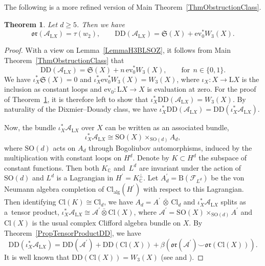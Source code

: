 \documentclass[11pt]{article}
\numberwithin{equation}{section}
\numberwithin{equation}{section}
\newtheorem{Theorem}{Theorem}[section]
\newcommand{\C}{\mathbb{C}}
\newcommand{\B}{\mathrm{B}}
\newcommand{\A}{\mathcal{A}}
\newcommand{\Cl}{\mathrm{Cl}}
\newcommand{\SO}{\mathrm{SO}}
\renewcommand{\L}{\mathrm{L}}
\newcommand{\DD}{\mathrm{DD}}
\newcommand{\oclass}{\mathfrak{or}}
\begin{document}
The following is a more refined version of Main Theorem~\ref{ThmObstructionClass}.

\begin{Theorem} \label{ThmRepeatedMain}
Let $d\geq 5$. Then we have
\begin{equation*}
\oclass(\A_{\L X}) = \tau(w_2), \qquad \DD(\A_{\L X}) = \mathfrak{S}(X) + \mathrm{ev}_0^*W_3(X).
\end{equation*}
\end{Theorem}

\begin{proof}
With a view on Lemma~\ref{LemmaH3BLSOZ}, it follows from Main Theorem~\ref{ThmObstructionClass} that
\begin{equation*}
\DD(\mathcal{A}_{\L X}) = \mathfrak{S}(X) + n \, \mathrm{ev}_0^*W_3(X), \qquad \text{for}~~n \in \{0, 1\}.
\end{equation*}
We have $\iota_X^* \mathfrak{S}(X) = 0$ and $\iota_X^*\mathrm{ev}_0^*W_3(X) = W_3(X)$, where $\iota_X \colon X \to \L X$ is the inclusion as constant loops and $\mathrm{ev}_0 \colon \L X \to X$ is evaluation at zero.
For the proof of Theorem~\ref{ThmRepeatedMain}, it is therefore left to show that $\iota_X^* \DD(\mathcal{A}_{\L X}) = W_3(X)$.
By naturality of the Dixmier--Douady class, we have $\iota_X^* \DD(\mathcal{A}_{\L X}) = \DD(\iota_X^*\mathcal{A}_{\L X})$.

Now, the bundle $\iota_X^*\mathcal{A}_{\L X}$ over $X$ can be written as an associated bundle,
\begin{equation*}
 \iota_X^*\mathcal{A}_{\L X} \cong \SO(X) \times_{\SO(d)} A_d,
\end{equation*}
where $\SO(d)$ acts on $A_d$ through Bogoliubov automorphisms, induced by the multiplication with constant loops on $H^d$.
Denote by $K\subset H^d$ the subspace of constant functions.
Then both $K_\C$ and~$L^d$ are invariant under the action of $\SO(d)$ and $L^d$ is a Lagrangian in $H^\prime = K_\C^\perp$.
Let $A_d^\prime = \B(\mathcal{F}_{L^d})$ be the von Neumann algebra completion of $\Cl_{\mathrm{alg}}(H^\prime)$ with respect to this Lagrangian.
Then identifying $\Cl(K) \cong \Cl_d$, we have $A_d = A^\prime \,\bar{\otimes}\, \Cl_d$ and $\iota_X^*\mathcal{A}_{\L X}$ splits as a~tensor product, $\iota_X^*\mathcal{A}_{\L X} \cong \mathcal{A}^\prime \bar{\otimes}\Cl(X)$, where $\mathcal{A}^\prime = \SO(X) \times_{\SO(d)} A^\prime$ and $\Cl(X)$ is the usual complex Clifford algebra bundle on $X$.
By Theorem~\ref{PropTensorProductDD}, we have
\begin{equation*}
 \DD(\iota_X^*\mathcal{A}_{\L X}) = \DD(\mathcal{A}^\prime) + \DD(\Cl(X)) + \beta(\oclass(\mathcal{A}^\prime) \smile \oclass(\Cl(X))).
\end{equation*}
It is well known that $\DD(\Cl(X)) = W_3(X)$ (see \cite[Lemma~7]{DonovanKaroubi} and \cite{MathaiMelroseSingerProjectiveFamilies}).


\end{proof}
\end{document}
